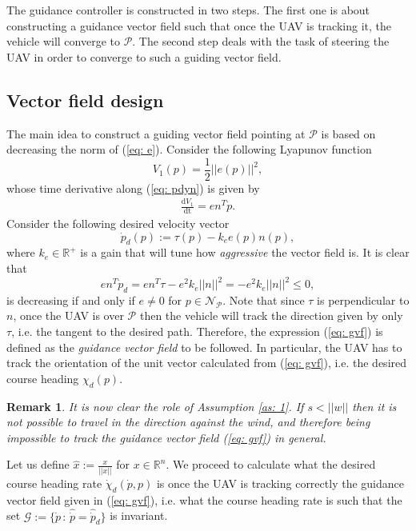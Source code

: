 \documentclass[letterpaper, 10 pt, conference]{ieeeconf}  %
\newtheorem{remark}[theorem]{Remark}
\begin{document}
The guidance controller is constructed in two steps. The first one is about constructing a guidance vector field such that once the UAV is tracking it, the vehicle will converge to $\mathcal{P}$. The second step deals with the task of steering the UAV in order to converge to such a guiding vector field.

\subsection{Vector field design}
The main idea to construct a guiding vector field pointing at $\mathcal{P}$ is based on decreasing the norm of (\ref{eq: e}). Consider the following Lyapunov function
\begin{equation}
	V_1(p) = \frac{1}{2}||e(p)||^2,
\end{equation}
whose time derivative along (\ref{eq: pdyn}) is given by
\begin{align}
	\frac{\mathrm{d}V_1}{\mathrm{dt}} = e n^T \dot p.
\end{align}
Consider the following desired velocity vector
\begin{equation}
	\dot p_d(p) := \tau(p) - k_e e(p)n(p),
	\label{eq: gvf}
\end{equation}
where $k_e\in\mathbb{R}^+$ is a gain that will tune how \emph{aggressive}
the vector field is. It is clear that
\begin{equation}
	e n^T \dot p_d = e n^T\tau - e^2k_e||n||^2 =  - e^2k_e||n||^2 \leq 0,
\end{equation}
is decreasing if and only if $e \neq 0$ for $p\in \mathcal{N}_\mathcal{P}$. Note that since $\tau$ is perpendicular to $n$, once the UAV is over $\mathcal{P}$ then the vehicle will track the direction given by only $\tau$, i.e. the tangent to the desired path. Therefore, the expression (\ref{eq: gvf}) is defined as the \emph{guidance vector field} to be followed. In particular, the UAV has to track the orientation of the unit vector calculated from (\ref{eq: gvf}), i.e. the desired course heading $\chi_d(p)$.

\begin{remark}
It is now clear the role of Assumption \ref{as: 1}. If $s < ||w||$ then it is not possible to travel in the direction against the wind, and therefore being impossible to track the guidance vector field (\ref{eq: gvf}) in general.
\end{remark}

Let us define $\hat{x}:= \frac{x}{||x||}$ for $x\in\mathbb{R}^n$. We proceed to calculate what the desired course heading rate $\dot\chi_d(\dot p, p)$ 
is once the UAV is tracking correctly the guidance vector field given in (\ref{eq: gvf}), i.e. what the course heading rate is such that the set ${\mathcal{G}} :=  \{\dot p \, : \, \hat{\dot p} = \hat{\dot p}_d\}$ is invariant.
\end{document}
